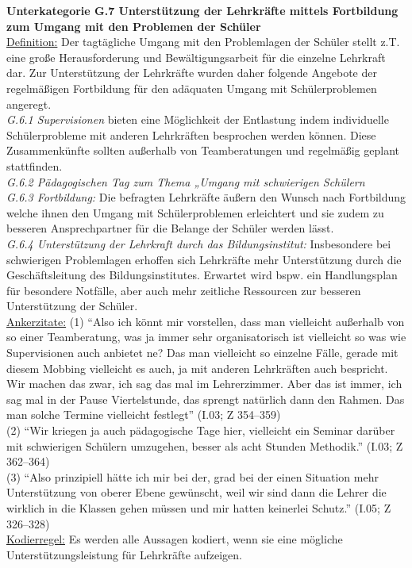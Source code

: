 \noindent
\textbf{Unterkategorie G.7 Unterstützung der Lehrkräfte mittels Fortbildung zum Umgang mit den Problemen der Schüler}\\
\underline{Definition:} Der tagtägliche Umgang mit den Problemlagen der Schüler stellt z.T. eine große Herausforderung und Bewältigungsarbeit für die einzelne Lehrkraft dar. Zur Unterstützung der Lehrkräfte wurden daher folgende Angebote der regelmäßigen Fortbildung für den adäquaten Umgang mit Schülerproblemen angeregt.\\
\textit{G.6.1 Supervisionen} bieten eine Möglichkeit der Entlastung indem individuelle Schülerprobleme mit anderen Lehrkräften besprochen werden können. Diese Zusammenkünfte sollten außerhalb von Teamberatungen und regelmäßig geplant stattfinden.\\
\textit{G.6.2 Pädagogischen Tag zum Thema „Umgang mit schwierigen Schülern}\\
\textit{G.6.3 Fortbildung:} Die befragten Lehrkräfte äußern den Wunsch nach Fortbildung welche ihnen den Umgang mit Schülerproblemen erleichtert und sie zudem zu besseren Ansprechpartner für die Belange der Schüler werden lässt.\\
\textit{G.6.4 Unterstützung der Lehrkraft durch das Bildungsinstitut:} Insbesondere bei schwierigen Problemlagen erhoffen sich Lehrkräfte mehr Unterstützung durch die Geschäftsleitung des Bildungsinstitutes. Erwartet wird bspw. ein Handlungsplan für besondere Notfälle, aber auch mehr zeitliche Ressourcen zur besseren Unterstützung der Schüler.\\
\underline{Ankerzitate:} (1) "`Also ich könnt mir vorstellen, dass man vielleicht außerhalb von so einer Teamberatung, was ja immer sehr organisatorisch ist vielleicht so was wie Supervisionen auch anbietet ne? Das man vielleicht so einzelne Fälle, gerade mit diesem Mobbing vielleicht es auch, ja mit anderen Lehrkräften auch bespricht. Wir machen das zwar, ich sag das mal im Lehrerzimmer. Aber das ist immer, ich sag mal in der Pause Viertelstunde, das sprengt natürlich dann den Rahmen. Das man solche Termine vielleicht festlegt"' (I.03; Z 354--359)\\ (2) "`Wir kriegen ja auch pädagogische Tage hier, vielleicht ein Seminar darüber mit schwierigen Schülern umzugehen, besser als acht Stunden Methodik."' (I.03; Z 362--364)\\ (3) "`Also prinzipiell hätte ich mir bei der, grad bei der einen Situation mehr Unterstützung von oberer Ebene gewünscht, weil wir sind dann die Lehrer die wirklich in die Klassen gehen müssen und mir hatten keinerlei Schutz."' (I.05; Z 326--328)\\
\underline{Kodierregel:} Es werden alle Aussagen kodiert, wenn sie eine mögliche Unterstützungsleistung für Lehrkräfte aufzeigen.\\

